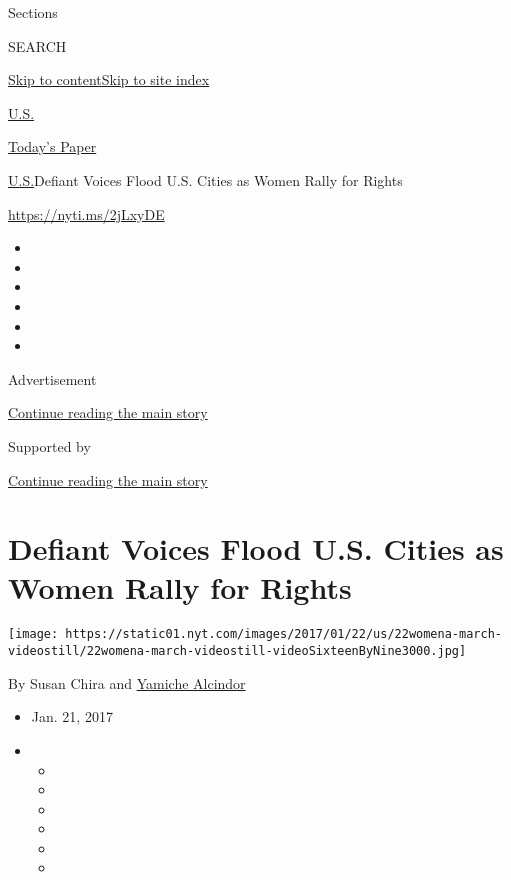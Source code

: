 Sections

SEARCH

\protect\hyperlink{site-content}{Skip to
content}\protect\hyperlink{site-index}{Skip to site index}

\href{https://www.nytimes.com/section/us}{U.S.}

\href{https://myaccount.nytimes.com/auth/login?response_type=cookie\&client_id=vi}{}

\href{https://www.nytimes.com/section/todayspaper}{Today's Paper}

\href{/section/us}{U.S.}\textbar{}Defiant Voices Flood U.S. Cities as
Women Rally for Rights

\url{https://nyti.ms/2jLxyDE}

\begin{itemize}
\item
\item
\item
\item
\item
\item
\end{itemize}

Advertisement

\protect\hyperlink{after-top}{Continue reading the main story}

Supported by

\protect\hyperlink{after-sponsor}{Continue reading the main story}

\hypertarget{defiant-voices-flood-us-cities-as-women-rally-for-rights}{%
\section{Defiant Voices Flood U.S. Cities as Women Rally for
Rights}\label{defiant-voices-flood-us-cities-as-women-rally-for-rights}}

\texttt{[image: https://static01.nyt.com/images/2017/01/22/us/22womena-march-videostill/22womena-march-videostill-videoSixteenByNine3000.jpg]}

By Susan Chira and
\href{http://www.nytimes.com/by/yamiche-alcindor}{Yamiche Alcindor}

\begin{itemize}
\item
  Jan. 21, 2017
\item
  \begin{itemize}
  \item
  \item
  \item
  \item
  \item
  \item
  \end{itemize}
\end{itemize}

